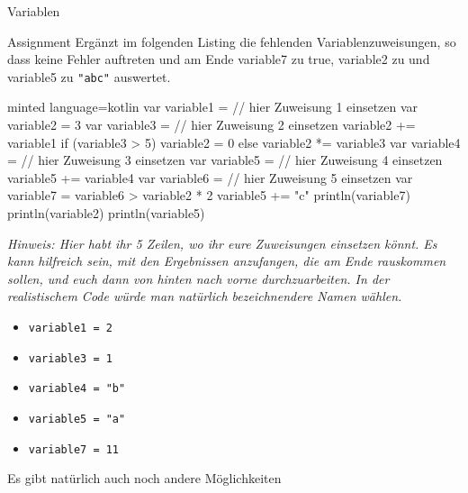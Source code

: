 \begin{task}[points=auto]{Variablen }
\begin{subtask*}[points=0]{Assignment}
        Ergänzt im folgenden Listing die fehlenden Variablenzuweisungen, so dass keine Fehler auftreten und am Ende {\ttfamily variable7} zu {\ttfamily true}, {\ttfamily variable2} zu {} und {\ttfamily variable5} zu {\ttfamily \verb+"abc"+} auswertet.
        \begin{codeBlock}[]{minted language=kotlin}
            var variable1 = // hier Zuweisung 1 einsetzen
            var variable2 = 3
            var variable3 = // hier Zuweisung 2 einsetzen
            variable2 += variable1
            if (variable3 > 5) {
                variable2 = 0
            } else {
                variable2 *= variable3
            }
            var variable4 = // hier Zuweisung 3 einsetzen
            var variable5 = // hier Zuweisung 4 einsetzen
            variable5 += variable4
            var variable6 = // hier Zuweisung 5 einsetzen
            var variable7 = variable6 > variable2 * 2
            variable5 += "c"
            println(variable7)
            println(variable2)
            println(variable5)
        \end{codeBlock}

        \textit{Hinweis: Hier habt ihr 5 Zeilen, wo ihr eure Zuweisungen einsetzen könnt. Es kann hilfreich sein, mit den Ergebnissen anzufangen, die am Ende rauskommen sollen, und euch dann von hinten nach vorne durchzuarbeiten. In der realistischem Code würde man natürlich bezeichnendere Namen wählen.}

        \begin{solution}
            \begin{itemize}
                \item {\ttfamily \verb+variable1 = 2+}
                \item {\ttfamily \verb+variable3 = 1+}
                \item {\ttfamily \verb+variable4 = "b"+}
                \item {\ttfamily \verb+variable5 = "a"+}
                \item {\ttfamily \verb+variable7 = 11+}
            \end{itemize}
            Es gibt natürlich auch noch andere Möglichkeiten
        \end{solution}
    \end{subtask*}
\end{task}

